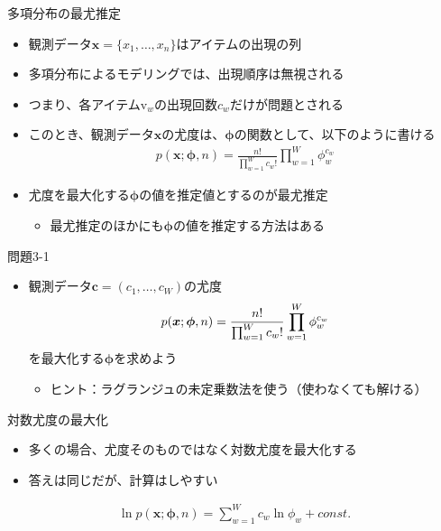 \documentclass[aspectratio=169,unicode,dvipdfmx,14pt]{beamer}
\begin{document}
\begin{frame}{多項分布の最尤推定}
\begin{itemize}
\item 観測データ$\bm{x}=\{x_1,\ldots,x_n\}$はアイテムの出現の列
\item 多項分布によるモデリングでは、出現順序は無視される
\item つまり、各アイテム$\mbox{v}_w$の出現回数$c_w$だけが問題とされる
\item このとき、観測データ$\bm{x}$の尤度は、$\bm{\phi}$の関数として、以下のように書ける
\begin{align}
p(\bm{x};\bm{\phi},n)=\frac{n!}{\prod_{w=1}^W c_w!}\prod_{w=1}^W\phi_w^{c_w}
\end{align}
\item 尤度を最大化する$\bm{\phi}$の値を推定値とするのが最尤推定
\begin{itemize}
\item 最尤推定のほかにも$\bm{\phi}$の値を推定する方法はある
\end{itemize}
\end{itemize}
\end{frame}

\begin{frame}{問題3-1}
\begin{itemize} 
\item 観測データ$\bm{c}=(c_1,\ldots,c_W)$の尤度
\begin{align}
p(\bm{x};\bm{\phi},n)=\frac{n!}{\prod_{w=1}^W c_w!}\prod_{w=1}^W\phi_w^{c_w} \notag
\end{align}
を最大化する$\bm{\phi}$を求めよう
\begin{itemize}
\item ヒント：ラグランジュの未定乗数法を使う（使わなくても解ける） 
\end{itemize}
\end{itemize}
\end{frame}

\begin{frame}{対数尤度の最大化}
\begin{itemize}
\item 多くの場合、尤度そのものではなく対数尤度を最大化する
\item 答えは同じだが、計算はしやすい
\end{itemize}
\begin{align}
\ln p(\bm{x};\bm{\phi},n)=\sum_{w=1}^W c_w\ln\phi_w + const.
\end{align}
\end{frame}
\end{document}
